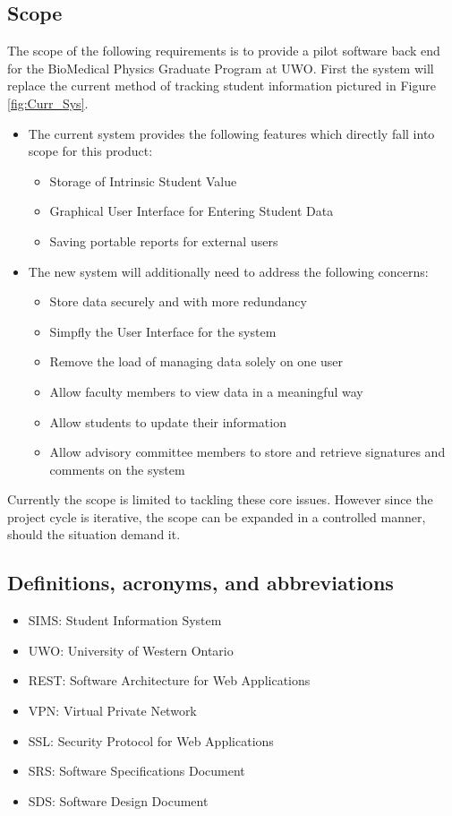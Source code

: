 \documentclass[11pt,a4paper]{report}
\begin{document}
\subsection{Scope}
The scope of the following requirements is to provide a pilot software back end for the BioMedical Physics
Graduate Program at UWO. First the system will replace the current method of tracking student information
pictured in Figure \ref{fig:Curr_Sys}.
\begin{itemize}
\item The current system provides the following features which directly fall into scope for this product:
\begin{itemize}
\item Storage of Intrinsic Student Value
\item Graphical User Interface for Entering Student Data
\item Saving portable reports for external users
\end{itemize}
\item The new system will additionally need to address the following concerns:
\begin{itemize} 
\item Store data securely and with more redundancy
\item Simpfly the User Interface for the system
\item Remove the load of managing data solely on one user
\item Allow faculty members to view data in a meaningful way
\item Allow students to update their information
\item Allow advisory committee members to store and retrieve signatures and comments on the system
\end{itemize} 
\end{itemize}
Currently the scope is limited to tackling these core issues. However since the project cycle is iterative,
the scope can be expanded in a controlled manner, should the situation demand it.
\subsection{Definitions, acronyms, and abbreviations}
\begin{itemize}
\item SIMS: Student Information System
\item UWO: University of Western Ontario
\item REST: Software Architecture for Web Applications
\item VPN: Virtual Private Network
\item SSL: Security Protocol for Web Applications
\item SRS: Software Specifications Document 
\item SDS: Software Design Document 
\end{itemize}
\end{document}
